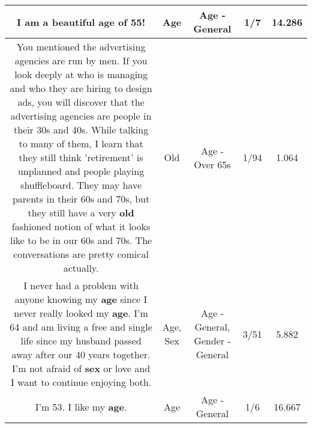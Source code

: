 \documentclass[11pt]{article}
\newlength\mylength
\begin{document}
\begin{center}
\begin{longtable}{|C{.65\mylength}|C{.30\mylength}|C{.12\mylength}|C{.12\mylength}|C{.12\mylength}|}
  \small I am a beautiful \textbf{age} of 55!\normalsize   & Age & Age - General & 1/7 & 14.286 \\  \hline
  \small You mentioned the advertising agencies are run by men. If you look deeply at who is managing and who they are hiring to design ads, you will discover that the advertising agencies are people in their 30s and 40s. While talking to many of them, I learn that they still think 'retirement' is unplanned and people playing shuffleboard. They may have parents in their 60s and 70s, but they still have a very \textbf{old} fashioned notion of what it looks like to be in our 60s and 70s. The conversations are pretty comical actually.\normalsize   & Old & Age - Over 65s & 1/94 & 1.064 \\  \hline
  \small I never had a problem with anyone knowing my \textbf{age} since I never really looked my \textbf{age}.  I'm 64 and am living a free and single life since my husband passed away after our 40 years together.  I'm not afraid of \textbf{sex} or love and I want to continue enjoying both.\normalsize   & Age, Sex & Age - General, Gender - General & 3/51 & 5.882 \\  \hline
  \small I'm 53. I like my \textbf{age}.\normalsize   & Age & Age - General & 1/6 & 16.667 \\  \hline

\end{longtable}
\end{center}
\end{document}

